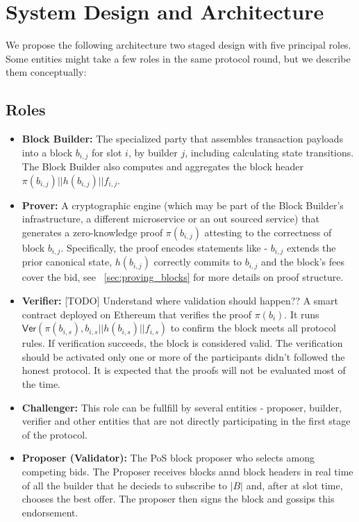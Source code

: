 \section{System Design and Architecture}
\label{sec:architecture}
We propose the following architecture two staged design with five principal roles. Some entities might take a few roles in the same protocol round, but we describe them conceptually:

\subsection{Roles}
\begin{itemize}
    \item \textbf{Block Builder:} The specialized party that assembles transaction payloads into a block $b_{i,j}$ for slot $i$, by builder $j$, including calculating state transitions. The Block Builder also computes and aggregates the block header $\pi(b_{i,j})||h(b_{i,j})||f_{i,j}$. 
    \item \textbf{Prover:} A cryptographic engine (which may be part of the Block Builder’s infrastructure, a different microservice or an out sourced service) that generates a zero-knowledge proof $\pi(b_{i,j})$ attesting to the correctness of block $b_{i,j}$. Specifically, the proof encodes statements like - $b_{i,j}$ extends the prior canonical state, $h(b_{i,j})$ correctly commits to $b_{i,j}$ and the block’s fees cover the bid, see ~\ref{sec:proving_blocks} for more details on proof structure.
    \item \textbf{Verifier:} 
    [TODO] Understand where validation should happen??
    A smart contract deployed on Ethereum that verifies the proof $\pi(b_i)$. It runs $\mathsf{Ver}(\pi(b_{i,s}), b_{i,s}||h(b_{i,s})||f_{i,s})$ to confirm the block meets all protocol rules. If verification succeeds, the block is considered valid.
    The verification should be activated only one or more of the participants didn't followed the honest protocol. It is expected that the proofs will not be evaluated most of the time.

    \item \textbf{Challenger:} This role can be fullfill by several entities - proposer, builder, verifier and other entities that are not directly participating in the first stage of the protocol.
    \item \textbf{Proposer (Validator):} The PoS block proposer who selects among competing bids. The Proposer receives blocks annd block headers in real time of all the builder that he decieds to subscribe to $|B|$ and, after at slot time, chooses the best offer. The proposer then signs the block and gossips this endorsement.
\end{itemize}

